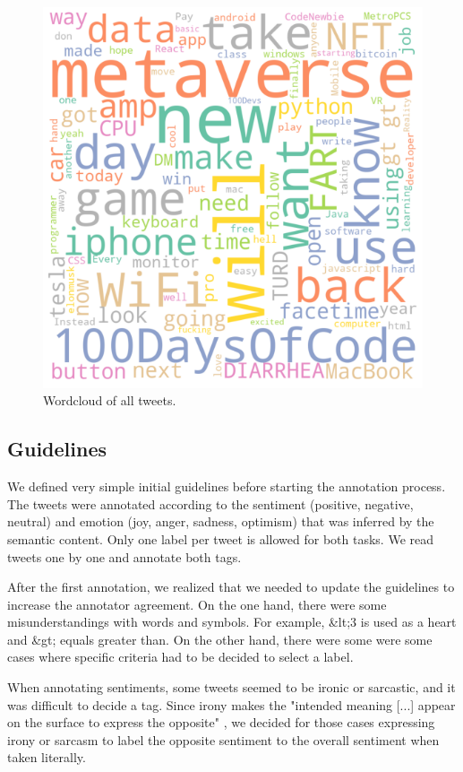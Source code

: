 \documentclass[11pt,a4paper]{article}
\begin{document}
\begin{figure}[ht]
    \centering
    \includegraphics[width=\linewidth]{wordcloud.png}
    \caption{Wordcloud of all tweets.}
    \label{fig:wordcloud}
\end{figure}

\subsection{Guidelines}

We defined very simple initial guidelines before starting the annotation process. The tweets were annotated according to the sentiment (positive, negative, neutral) and emotion (joy, anger, sadness, optimism) that was inferred by the semantic content. Only one label per tweet is allowed for both tasks. We read tweets one by one and annotate both tags.

After the first annotation, we realized that we needed to update the guidelines to increase the annotator agreement. On the one hand, there were some misunderstandings with words and symbols. For example, \&lt;3 is used as a heart and \&gt; equals greater than. On the other hand, there were some were some cases where specific criteria had to be decided to select a label.

When annotating sentiments, some tweets seemed to be ironic or sarcastic, and it was difficult to decide a tag. Since irony makes the "intended meaning [...] appear on the surface to express the opposite" \cite{OUP2022}, we decided for those cases expressing irony or sarcasm to label the opposite sentiment to the overall sentiment when taken literally. 
\end{document}
